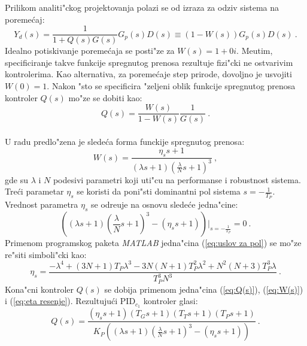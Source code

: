 \documentclass[a4paper,11pt]{article}
\theoremstyle{definition} \newtheorem{deff}{Definicija}[section]
\theoremstyle{definition} \newtheorem{prim}[deff]{Primer}
\theoremstyle{plain} \newtheorem{teor}[deff]{Teorema}
\begin{document}
	Prilikom analiti"ckog projektovanja polazi se od izraza za odziv sistema na poreme\'caj:
	\begin{equation}
		Y_d(s) = \frac{1}{1+Q(s)G(s)}G_{p}(s)D(s) \equiv (1 - W(s))G_{p}(s)D(s)~. 
	\end{equation}
	Idealno potiskivanje poreme\'caja se posti"ze za $W(s) = 1 + 0i$. Me\dj{}utim, specificiranje takve funkcije spregnutog prenosa rezultuje fizi"cki ne ostvarivim kontrolerima. Kao alternativa, za poreme\'caje step prirode, dovoljno je usvojiti $W(0) = 1$. Nakon "sto se specificira "zeljeni oblik funkcije spregnutog prenosa kontroler $Q(s)$ mo"ze se dobiti kao:
	\begin{equation}\label{eq:Q(s)}
		Q(s) = \frac{W(s)}{1-W(s)}\frac{1}{G(s)}~.
	\end{equation}\\
	
	U radu \cite{inicijalna} predlo"zena je slede\'ca forma funckije spregnutog prenosa:
	\begin{equation}\label{eq:W(s)}
		W(s) = \frac{\eta_ss+1}{(\lambda s + 1)(\frac{\lambda}{N}s + 1)^3}~,
	\end{equation}
	gde su $\lambda$ i $N$ podesivi parametri koji uti"cu na performanse i robustnost sistema. Tre\'ci parametar $\eta_s$ se koristi da poni"sti dominantni pol sistema $s = - \frac{1}{T_P}$. Vrednost parametra $\eta_s$ se odre\dj{}uje na osnovu slede\'ce jedna"cine: 
	\begin{equation}\label{eq:uslov za pol}
		((\lambda s + 1)(\frac{\lambda}{N}s+1)^3 - (\eta_ss + 1))|_{s = -\frac{1}{T_P}} = 0~.
	\end{equation}
	Primenom programskog paketa \emph{MATLAB} jedna"cina (\ref{eq:uslov za pol}) se mo"ze re"siti simboli"cki kao:  
	\begin{equation}\label{eq:eta resenje}
		\eta_s = \frac{-\lambda^4 + (3N + 1)T_P\lambda^3-3N(N+1)T_P^2\lambda^2+N^2(N+3)T_P^3\lambda}{T_P^3N^3}~.
	\end{equation}
	Kona"cni kontroler $Q(s)$ se dobija primenom jedna"cina (\ref{eq:Q(s)}), (\ref{eq:W(s)}) i (\ref{eq:eta resenje}). Rezultuju\'ci PID$_{c_1}$ kontroler glasi:
	\begin{equation}\label{eq:pidc}
		Q(s) = \frac{(\eta_ss+1)(T_Gs+1)(T_Ts+1)(T_Ps+1)}{K_P((\lambda s+1)(\frac{\lambda}{N}s+1)^3-(\eta_ss+1))}~.
	\end{equation}\\
	
\end{document}
